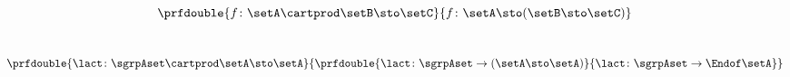 {\begin{forslides}
        \begin{equation}
            \label{eq:currycurry}
            \prfdouble{
                f \colon \setA \cartprod \setB \sto \setC
            }{
                f \colon \setA \sto ( \setB \sto \setC)
            }
        \end{equation}
        ~
        \begin{equation}
            \label{eq:currybis}
            \prfdouble{
                \lact \colon \sgrpAset \cartprod \setA \sto \setA
            }{
                \prfdouble{
                    \lact \colon \sgrpAset \to (\setA \sto \setA)
                }{
                    \lact \colon \sgrpAset \to \Endof\setA
                }
            }
        \end{equation}

    \end{forslides}
}